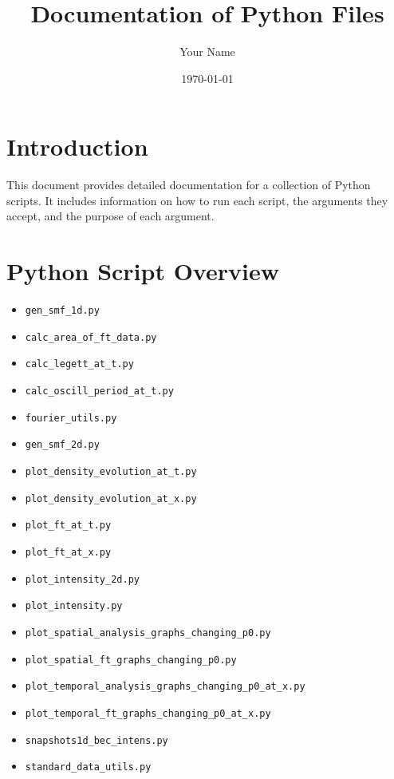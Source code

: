 \documentclass{article}
\title{Documentation of Python Files}
\author{Your Name}
\date{\today}
\begin{document}
\maketitle

\tableofcontents

\newpage

\section{Introduction}
This document provides detailed documentation for a collection of Python scripts. It includes information on how to run each script, the arguments they accept, and the purpose of each argument.

\section{Python Script Overview}
\begin{itemize}
    \item \texttt{gen\_smf\_1d.py}
    \item \texttt{calc\_area\_of\_ft\_data.py}
    \item \texttt{calc\_legett\_at\_t.py}
    \item \texttt{calc\_oscill\_period\_at\_t.py}
    \item \texttt{fourier\_utils.py}
    \item \texttt{gen\_smf\_2d.py}
    \item \texttt{plot\_density\_evolution\_at\_t.py}
    \item \texttt{plot\_density\_evolution\_at\_x.py}
    \item \texttt{plot\_ft\_at\_t.py}
    \item \texttt{plot\_ft\_at\_x.py}
    \item \texttt{plot\_intensity\_2d.py}
    \item \texttt{plot\_intensity.py}
    \item \texttt{plot\_spatial\_analysis\_graphs\_changing\_p0.py}
    \item \texttt{plot\_spatial\_ft\_graphs\_changing\_p0.py}
    \item \texttt{plot\_temporal\_analysis\_graphs\_changing\_p0\_at\_x.py}
    \item \texttt{plot\_temporal\_ft\_graphs\_changing\_p0\_at\_x.py}
    \item \texttt{snapshots1d\_bec\_intens.py}
    \item \texttt{standard\_data\_utils.py}
\end{itemize}
\end{document}

